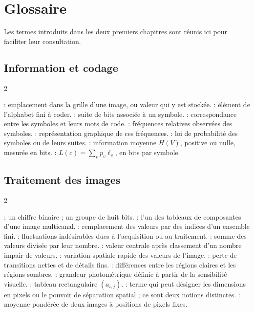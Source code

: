 \chapter*{Glossaire}
Les termes introduits dans les deux premiers chapitres sont réunis ici pour faciliter leur consultation.

\section*{Information et codage}
\begin{multicols}{2}\small\raggedright
\begin{rs}
 : emplacement dans la grille d'une image, ou valeur qui y est stockée.
 : élément de l'alphabet fini à coder.
 : suite de bits associée à un symbole.
 : correspondance entre les symboles et leurs mots de code.
 : fréquences relatives observées des symboles.
 : représentation graphique de ces fréquences.
 : loi de probabilité des symboles ou de leurs suites.
 : information moyenne $H(V)$, positive ou nulle, mesurée en bits.
 : $L(c)=\sum_vp_v\ell_v$, en bits par symbole.
\end{rs}
\end{multicols}

\section*{Traitement des images}
\begin{multicols}{2}\small\raggedright
\begin{rs}
 : un chiffre binaire ; un groupe de huit bits.
 : l'un des tableaux de composantes d'une image multicanal.
 : remplacement des valeurs par des indices d'un ensemble fini.
 : fluctuations indésirables dues à l'acquisition ou au traitement.
 : somme des valeurs divisée par leur nombre.
 : valeur centrale après classement d'un nombre impair de valeurs.
 : variation spatiale rapide des valeurs de l'image.
 : perte de transitions nettes et de détails fins.
 : différences entre les régions claires et les régions sombres.
 : grandeur photométrique définie à partir de la sensibilité visuelle.
 : tableau rectangulaire $(a_{i,j})$.
 : terme qui peut désigner les dimensions en pixels ou le pouvoir de séparation spatial ; ce sont deux notions distinctes.
 : moyenne pondérée de deux images à positions de pixels fixes.
\end{rs}
\end{multicols}
